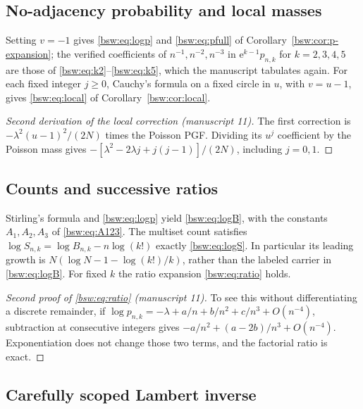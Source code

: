 \documentclass[11pt,letterpaper]{article}
\theoremstyle{definition}
\theoremstyle{remark}
\newcommand{\ee}{\mathrm e}
\begin{document}
\subsection{No-adjacency probability and local masses}

Setting $v=-1$ gives \eqref{bsw:eq:logp} and \eqref{bsw:eq:pfull} of
Corollary~\ref{bsw:cor:p-expansion}; the verified coefficients of
$n^{-1},n^{-2},n^{-3}$ in $\ee^{k-1}p_{n,k}$ for $k=2,3,4,5$ are those of
\eqref{bsw:eq:k2}--\eqref{bsw:eq:k5}, which the manuscript tabulates again.
For each fixed integer $j\ge0$, Cauchy's formula on a fixed circle in $u$,
with $v=u-1$, gives \eqref{bsw:eq:local} of Corollary~\ref{bsw:cor:local}.

\begin{proof}[Second derivation of the local correction (manuscript 11)]
The first correction is $-\lambda^2(u-1)^2/(2N)$ times the Poisson PGF.
Dividing its $u^j$ coefficient by the Poisson mass gives
$-[\lambda^2-2\lambda j+j(j-1)]/(2N)$, including $j=0,1$.
\end{proof}

\subsection{Counts and successive ratios}

Stirling's formula and \eqref{bsw:eq:logp} yield \eqref{bsw:eq:logB}, with
the constants $A_1,A_2,A_3$ of \eqref{bsw:eq:A123}.  The multiset count
satisfies $\log S_{n,k}=\log B_{n,k}-n\log(k!)$ exactly
\eqref{bsw:eq:logS}.  In particular its leading growth is
$N(\log N-1-\log(k!)/k)$, rather than the labeled carrier in
\eqref{bsw:eq:logB}.  For fixed $k$ the ratio expansion
\eqref{bsw:eq:ratio} holds.

\begin{proof}[Second proof of \eqref{bsw:eq:ratio} (manuscript 11)]
To see this without differentiating a discrete remainder, if
$\log p_{n,k}=-\lambda+a/n+b/n^2+c/n^3+O(n^{-4})$, subtraction at
consecutive integers gives $-a/n^2+(a-2b)/n^3+O(n^{-4})$.  Exponentiation
does not change those two terms, and the factorial ratio is exact.
\end{proof}

\subsection{Carefully scoped Lambert inverse}\label{bsw:rp:sec:inverse}
\end{document}
